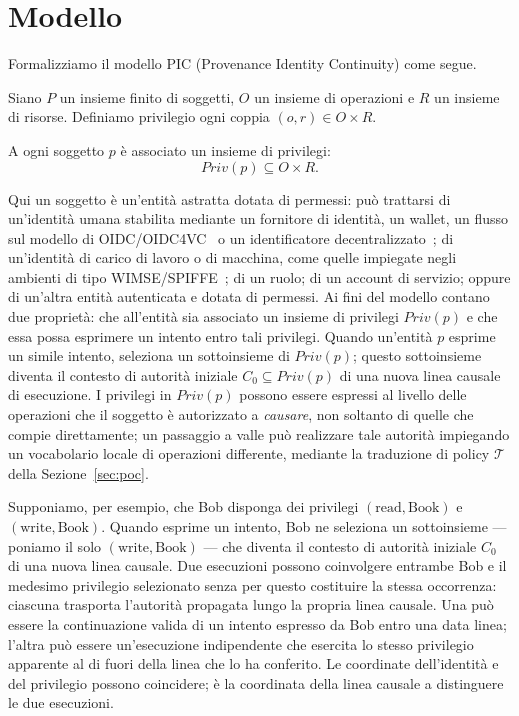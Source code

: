 \documentclass[11pt]{article}
\begin{document}
\section{Modello}

Formalizziamo il modello PIC (Provenance Identity Continuity) come segue.

Siano $P$ un insieme finito di soggetti, $O$ un insieme di operazioni e $R$ un
insieme di risorse. Definiamo privilegio ogni coppia $(o, r) \in O \times R$.

A ogni soggetto $p$ è associato un insieme di privilegi:
\[
Priv(p) \subseteq O \times R.
\]

Qui un soggetto è un'entità astratta dotata di permessi: può trattarsi di
un'identità umana stabilita mediante un fornitore di identità, un wallet, un
flusso sul modello di OIDC/OIDC4VC~\cite{openidconnect2014,openid4vc2024} o un
identificatore decentralizzato~\cite{didcore2022}; di un'identità di carico di
lavoro o di macchina, come quelle impiegate negli ambienti di tipo
WIMSE/SPIFFE~\cite{wimse2024,spiffe2017}; di un ruolo; di un account di servizio;
oppure di un'altra entità autenticata e dotata di permessi. Ai fini del modello
contano due proprietà: che all'entità sia associato un insieme di privilegi
$Priv(p)$ e che essa possa esprimere un intento entro tali privilegi. Quando
un'entità $p$ esprime un simile intento, seleziona un sottoinsieme di $Priv(p)$;
questo sottoinsieme diventa il contesto di autorità iniziale
$C_0 \subseteq Priv(p)$ di una nuova linea causale di esecuzione. I privilegi in
$Priv(p)$ possono essere espressi al livello delle operazioni che il soggetto è
autorizzato a \emph{causare}, non soltanto di quelle che compie direttamente;
un passaggio a valle può realizzare tale autorità impiegando un vocabolario
locale di operazioni differente, mediante la traduzione di policy $\mathcal{T}$
della Sezione~\ref{sec:poc}.

Supponiamo, per esempio, che Bob disponga dei privilegi
$(\text{read},\text{Book})$ e $(\text{write},\text{Book})$. Quando esprime un
intento, Bob ne seleziona un sottoinsieme --- poniamo il solo
$(\text{write},\text{Book})$ --- che diventa il contesto di autorità iniziale
$C_0$ di una nuova linea causale. Due esecuzioni possono coinvolgere entrambe
Bob e il medesimo privilegio selezionato senza per questo costituire la stessa
occorrenza: ciascuna trasporta l'autorità propagata lungo la propria linea
causale. Una può essere la continuazione valida di un intento espresso da Bob
entro una data linea; l'altra può essere un'esecuzione indipendente che esercita
lo stesso privilegio apparente al di fuori della linea che lo ha conferito. Le
coordinate dell'identità e del privilegio possono coincidere; è la coordinata
della linea causale a distinguere le due esecuzioni.
\end{document}
